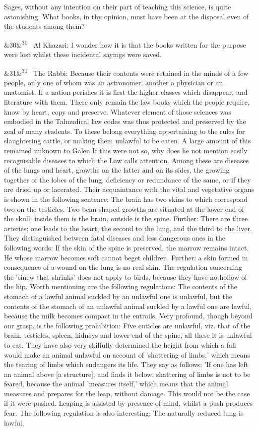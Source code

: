 \documentclass[12pt]{article}
\newcommand{\para}[1][]{\par\noindent\ifx&#1&\else\textsuperscript{\footnotesize #1}~\fi}
\begin{document}
Sages, without any intention on their part of teaching this science, is quite astonishing. What books, in thy opinion, must have been at the disposal even of the students among them?

\para[30] Al Khazari: I wonder how it is that the books written for the purpose were lost whilst these incidental sayings were saved.

\para[31] The Rabbi: Because their contents were retained in the minds of a few people, only one of whom was an astronomer, another a physician or an anatomist. If a nation perishes it is first the higher classes which disappear, and literature with them. There only remain the law books which the people require, know by heart, copy and preserve. Whatever element of those sciences was embodied in the Talmudical law codes was thus protected and preserved by the zeal of many students. To these belong everything appertaining to the rules for slaughtering cattle, or making them unlawful to be eaten. A large amount of this remained unknown to Galen If this were not so, why does he not mention easily recognisable diseases to which the Law calls attention. Among these are diseases of the lungs and heart, growths on the latter and on its sides, the growing together of the lobes of the lung, deficiency or redundance of the same, or if they are dried up or lacerated. Their acquaintance with the vital and vegetative organs is shown in the following sentence: The brain has two skins to which correspond two on the testicles. Two bean-shaped growths are situated at the lower end of the skull; inside them is the brain, outside is the spine. Further: There are three arteries; one leads to the heart, the second to the lung, and the third to the liver. They distinguished between fatal diseases and less dangerous ones in the following words: If the skin of the spine is preserved, the marrow remains intact. He whose marrow becomes soft cannot beget children. Further: a skin formed in consequence of a wound on the lung is no real skin. The regulation concerning the 'sinew that shrinks' does not apply to birds, because they have no hollow of the hip. Worth mentioning are the following regulations: The contents of the stomach of a lawful animal suckled by an unlawful one is unlawful, but the contents of the stomach of an unlawful animal suckled by a lawful one are lawful, because the milk becomes compact in the entrails. Very profound, though beyond our grasp, is the following prohibition: Five cuticles are unlawful, viz. that of the brain, testicles, spleen, kidneys and lower end of the spine, all these it is unlawful to eat. They have also very skilfully determined the height from which a fall would make an animal unlawful on account of 'shattering of limbs,' which means the tearing of limbs which endangers its life. They say as follows: 'If one has left an animal above [a structure], and finds it below, shattering of limbs is not to be feared, because the animal 'measures itself,' which means that the animal measures and prepares for the leap, without damage. This would not be the case if it were pushed. Leaping is assisted by presence of mind, whilst a push produces fear. The following regulation is also interesting: The naturally reduced lung is lawful, 
\end{document}
